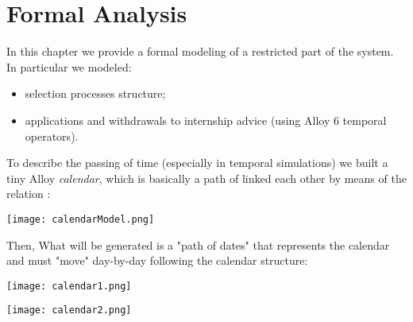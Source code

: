 \chapter{Formal Analysis}
	In this chapter we provide a formal modeling of a restricted part of the system. In particular we modeled:
	\begin{itemize}
		\item selection processes structure;
		\item applications and withdrawals to internship advice (using Alloy 6 temporal operators).
	\end{itemize}
	
	To describe the passing of time (especially in temporal simulations) we built a tiny Alloy \emph{calendar}, which is basically a path of  linked each other by means of the relation :
	\begin{center}
		\texttt{[image: calendarModel.png]}
	\end{center}
	
	Then, What will be generated is a "path of dates" that represents the calendar and  must "move" day-by-day following the calendar structure:
	\begin{center}
		\texttt{[image: calendar1.png]}
	\end{center}
	\begin{center}
		\texttt{[image: calendar2.png]}
	\end{center}
	
